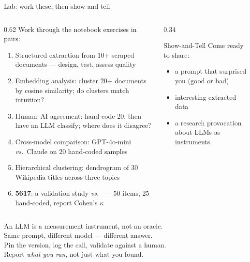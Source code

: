 \documentclass[9pt,aspectratio=169]{beamer}
\begin{document}
\begin{frame}{Lab: work these, then show-and-tell}
    \begin{columns}[T]
        \begin{column}{0.62\textwidth}
            Work through the notebook exercises in pairs:
            \begin{enumerate}\small
                \item Structured extraction from 10+ scraped documents --- design, test, assess quality
                \item Embedding analysis: cluster 20+ documents by cosine similarity; do clusters match intuition?
                \item Human--AI agreement: hand-code 20, then have an LLM classify; where does it disagree?
                \item Cross-model comparison: GPT-4o-mini \textit{vs.}\ Claude on 20 hand-coded samples
                \item Hierarchical clustering: dendrogram of 30 Wikipedia titles across three topics
                \item[6.] \textcolor{tab-purple}{\textbf{5617}}: a validation study \textit{vs.}\ \textcite{ziems2024can} --- 50 items, 25 hand-coded, report Cohen's $\kappa$
            \end{enumerate}
        \end{column}
        \begin{column}{0.34\textwidth}
            \begin{block}{Show-and-Tell}
                \footnotesize Come ready to share:
                \begin{itemize}\footnotesize
                    \item a prompt that surprised you (good or bad)
                    \item interesting extracted data
                    \item a research provocation about LLMs as instruments
                \end{itemize}
            \end{block}
        \end{column}
    \end{columns}
\end{frame}

\begin{frame}[standout]
    An LLM is a measurement instrument, not an oracle.\\
    Same prompt, different model --- different answer.\\[1em]
    Pin the version, log the call, validate against a human.\\[1em]
    {\large Report \textit{what you ran}, not just what you found.}
\end{frame}
\end{document}

